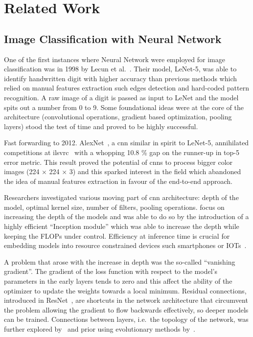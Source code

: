 \chapter{Related Work}
\label{ch:related-work}

\section{Image Classification with Neural Network}
\label{sec:image-classification-with-neural-network}

One of the first instances where Neural Network were employed for image
classification was in 1998 by Lecun et al.~\cite{GradientBasedLecun1998}. Their
model, LeNet-5, was able to identify handwritten digit with higher accuracy
than previous methods which relied on manual features extraction such edges
detection and hard-coded pattern recognition. A raw image of a digit is passed
as input to LeNet and the model spits out a number from 0 to 9. Some
foundational ideas were at the core of the architecture (convolutional
operations, gradient based optimization, pooling layers) stood the test of time
and proved to be highly successful.

Fast forwarding to 2012. AlexNet~\cite{ImagenetClassiKrizhe2017}, a
\acrfull{cnn} similar in spirit to LeNet-5, annihilated competitions at
\acrfull{ilsvrc}~\cite{ImagenetLargeRussak2014} with a whopping 10.8 \% gap on
the runner-up in top-5 error metric. This result proved the potential of
\acrshort{cnn}s to process bigger color images (224 × 224 × 3) and this sparked
interest in the field which abandoned the idea of manual features extraction in
favour of the end-to-end approach.

Researchers investigated various moving part of \acrshort{cnn} architecture:
depth of the model, optimal kernel size, number of filters, pooling operations.
\cite{VeryDeepConvoSimony2014,GoingDeeperWiSzeged2014} focus on increasing the
depth of the models and \cite{GoingDeeperWiSzeged2014} was able to do so by the
introduction of a highly efficient ``Inception module'' which was able to
increase the depth while keeping the FLOPs under control. Efficiency at
inference time is crucial for embedding models into resource constrained
devices such smartphones or IOTs~\cite{SqueezenetAleIandol2016,
MnasnetPlatfoTanM2018, MobilenetsEffHoward2017}.

A problem that arose with the increase in depth was the so-called ``vanishing
gradient''. The gradient of the loss function with respect to the model's
parameters in the early layers tends to zero and this affect the ability of the
optimizer to update the weights towards a local minimum. Residual connections,
introduced in ResNet~\cite{DeepResidualLHeKa2015, IdentityMappinHeKa2016}, are
shortcuts in the network architecture that circumvent the problem allowing the
gradient to flow backwards effectively, so deeper models can be trained.
Connections between layers, i.e.\ the topology of the network, was further
explored by~\cite{DualPathNetwoChen2017, DenselyConnectHuang2016} and prior
using evolutionary methods by~\cite{DesigningNeuraMiller1989,
EvolvingNeuralStanle2002}.

